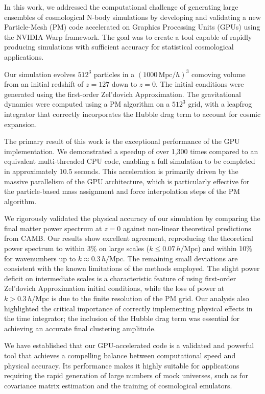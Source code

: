 \documentclass[]{article}
\begin{document}
In this work, we addressed the computational challenge of generating large ensembles of cosmological N-body simulations by developing and validating a new Particle-Mesh (PM) code accelerated on Graphics Processing Units (GPUs) using the NVIDIA Warp framework. The goal was to create a tool capable of rapidly producing simulations with sufficient accuracy for statistical cosmological applications.

Our simulation evolves $512^3$ particles in a $(1000 \, \text{Mpc}/h)^3$ comoving volume from an initial redshift of $z=127$ down to $z=0$. The initial conditions were generated using the first-order Zel'dovich Approximation. The gravitational dynamics were computed using a PM algorithm on a $512^3$ grid, with a leapfrog integrator that correctly incorporates the Hubble drag term to account for cosmic expansion.

The primary result of this work is the exceptional performance of the GPU implementation. We demonstrated a speedup of over 1,300 times compared to an equivalent multi-threaded CPU code, enabling a full simulation to be completed in approximately 10.5 seconds. This acceleration is primarily driven by the massive parallelism of the GPU architecture, which is particularly effective for the particle-based mass assignment and force interpolation steps of the PM algorithm.

We rigorously validated the physical accuracy of our simulation by comparing the final matter power spectrum at $z=0$ against non-linear theoretical predictions from CAMB. Our results show excellent agreement, reproducing the theoretical power spectrum to within 3\% on large scales ($k \le 0.07 \, h/\text{Mpc}$) and within 10\% for wavenumbers up to $k \approx 0.3 \, h/\text{Mpc}$. The remaining small deviations are consistent with the known limitations of the methods employed. The slight power deficit on intermediate scales is a characteristic feature of using first-order Zel'dovich Approximation initial conditions, while the loss of power at $k > 0.3 \, h/\text{Mpc}$ is due to the finite resolution of the PM grid. Our analysis also highlighted the critical importance of correctly implementing physical effects in the time integrator; the inclusion of the Hubble drag term was essential for achieving an accurate final clustering amplitude.

We have established that our GPU-accelerated code is a validated and powerful tool that achieves a compelling balance between computational speed and physical accuracy. Its performance makes it highly suitable for applications requiring the rapid generation of large numbers of mock universes, such as for covariance matrix estimation and the training of cosmological emulators.
\end{document}
